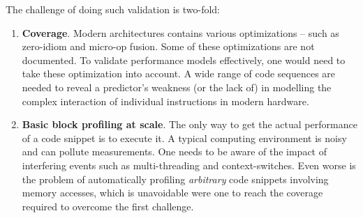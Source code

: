The challenge of doing such validation is two-fold:
\begin{enumerate}
    \item \textbf{Coverage}.
    Modern architectures contains various optimizations --
    such as zero-idiom and micro-op fusion.
    Some of these optimizations are not documented.
    To validate performance models effectively, one would need to take 
    these optimization into account.
    A wide range of code sequences are needed to reveal a predictor's 
    weakness (or the lack of) in modelling the complex interaction of 
    individual instructions in modern hardware.
    
    \item \textbf{Basic block profiling at scale}.
    The only way to get the actual performance of a code snippet is
    to execute it.
    A typical computing environment is noisy and can pollute measurements.
    One needs to be aware of the impact of interfering events such as
    multi-threading and context-switches.
    Even worse is the problem of automatically profiling 
    \textit{arbitrary} code snippets involving memory accesses,
    which is unavoidable were one to reach the coverage required to
    overcome the first challenge.
\end{enumerate}


